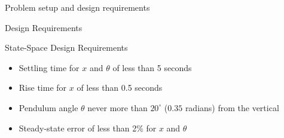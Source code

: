 \begin{frame}{Problem setup and design requirements}
\begin{block}{Design Requirements}
\begin{block}{State-Space Design Requirements}
\protect{}\label{state-space-design-requirements}
\begin{itemize}
\item
  Settling time for \(x\) and \(\theta\) of less than 5 seconds
\item
  Rise time for \(x\) of less than 0.5 seconds
\item
  Pendulum angle \(\theta\) never more than \(20^{\circ}\) (\(0.35\)
  radians) from the vertical
\item
  Steady-state error of less than 2\% for \(x\) and \(\theta\)
\end{itemize}
\end{block}
\end{block}
\end{frame}

